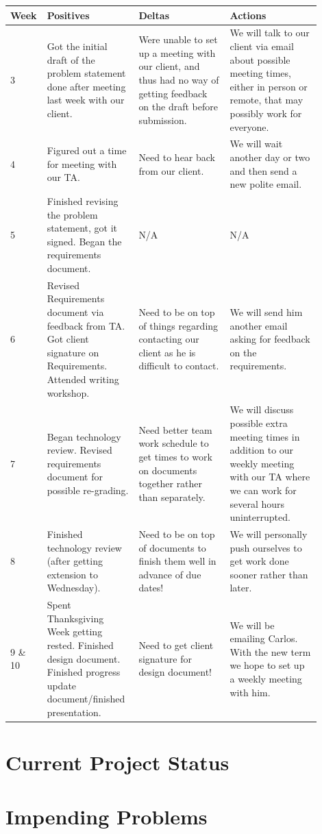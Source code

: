 \documentclass[onecolumn, draftclsnofoot,10pt, compsoc]{IEEEtran}
\begin{document}
\begin{tabular}{|p{0.05\linewidth}|p{0.285\linewidth}|p{0.285\linewidth}|p{0.285\linewidth}|}
\hline 
Week & Positives & Deltas & Actions \\ \hline

3 &
Got the initial draft of the problem statement done after meeting last 
	week with our client. &
Were unable to set up a meeting with our client, and thus had no way of 
	getting feedback on the draft before submission. &
We will talk to our client via email about possible meeting times, either 
	in person or remote, that may possibly work for everyone. \\ \hline

4 &
Figured out a time for meeting with our TA. &
Need to hear back from our client. &
We will wait another day or two and then send a new polite email. \\ \hline

5 &
Finished revising the problem statement, got it signed. Began the requirements document. & N/A & N/A\\ \hline

6 &
Revised Requirements document via feedback from TA. Got client signature on Requirements. 
	Attended writing workshop. &
Need to be on top of things regarding contacting our client as he is difficult to contact. &
We will send him another email asking for feedback on the requirements. \\ \hline

7 &
Began technology review. Revised requirements document for possible re-grading. &
Need better team work schedule to get times to work on documents together rather than separately. &
We will discuss possible extra meeting times in addition to our weekly meeting 
	with our TA where we can work for several hours uninterrupted. \\ \hline

8 &
Finished technology review (after getting extension to Wednesday). &
Need to be on top of documents to finish them well in advance of due dates! &
We will personally push ourselves to get work done sooner rather than later. \\ \hline


9 \& 10 &
Spent Thanksgiving Week getting rested. Finished design document. 
	Finished progress update document/finished presentation. &
Need to get client signature for design document! &
We will be emailing Carlos. With the new term we hope to set up a weekly meeting with him.  \\ \hline

\hline
\end{tabular}

\section{Current Project Status}


\section{Impending Problems}
\end{document}
